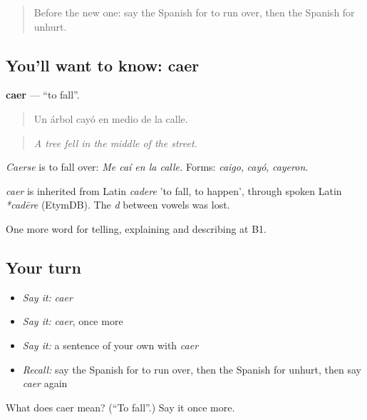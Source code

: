 \label{lesson:ES-C527-caer}



\begin{quote}
Before the new one: say the Spanish for to run over, then the Spanish for unhurt.
\end{quote}

\subsection*{You'll want to know: caer}
\textbf{caer} — \textquotedblleft{}to fall\textquotedblright{}.

\begin{quote}
Un árbol cayó en medio de la calle.
\end{quote}

\begin{quote}
\emph{A tree fell in the middle of the street.}
\end{quote}

\emph{Caerse} is to fall over: \emph{Me caí en la calle.} Forms: \emph{caigo}, \emph{cayó}, \emph{cayeron}.

\begin{cousinweb}
\emph{caer} is inherited from Latin \emph{cadere} 'to fall, to happen', through spoken Latin \emph{*cadēre} (EtymDB). The \emph{d} between vowels was lost.
\end{cousinweb}

\begin{grammarlens}[title={What you've built}]
One more word for telling, explaining and describing at B1.
\end{grammarlens}

\subsection*{Your turn}
\begin{itemize}
\raggedright
  \item \emph{Say it:} \emph{caer}
  \item \emph{Say it:} \emph{caer}, once more
  \item \emph{Say it:} a sentence of your own with \emph{caer}
  \item \emph{Recall:} say the Spanish for to run over, then the Spanish for unhurt, then say \emph{caer} again
\end{itemize}

\begin{tcolorbox}[breakable,colback=teal!4,colframe=teal!35!black,title={Before you move on}]
What does caer mean? (\textquotedblleft{}To fall\textquotedblright{}.) Say it once more.
\end{tcolorbox}
